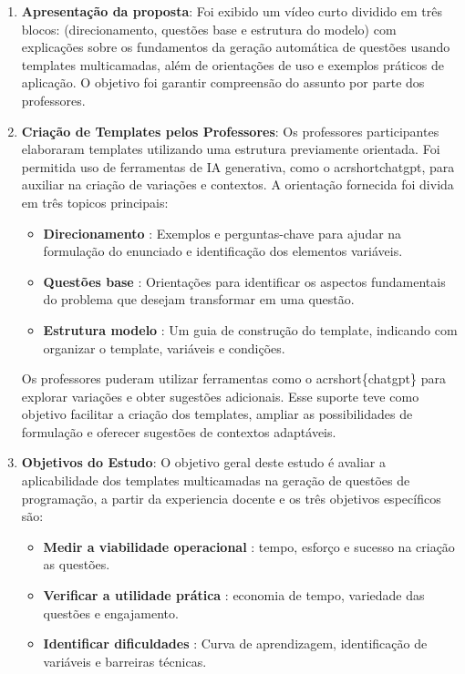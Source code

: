 \begin{enumerate}
    \item \textbf{Apresentação da proposta}:  Foi exibido um vídeo curto dividido em três blocos: (direcionamento, questões base e estrutura do modelo) com explicações sobre os fundamentos da geração automática de questões usando templates multicamadas, além de orientações de uso e exemplos práticos de aplicação. O objetivo foi garantir  compreensão do assunto por parte dos professores.
    
    \item \textbf{Criação de Templates pelos Professores}:  Os professores participantes elaboraram templates utilizando uma estrutura previamente orientada. Foi permitida uso de ferramentas de IA generativa, como o acrshort{chatgpt}, para auxiliar na criação de variações e contextos. A orientação fornecida foi divida em três topicos principais:
    \begin{itemize}
        \item \textbf{Direcionamento} : Exemplos e perguntas-chave para ajudar na formulação do enunciado e identificação dos elementos variáveis.
        \item \textbf{Questões base} : Orientações para identificar os aspectos fundamentais do problema que desejam transformar em uma questão.
        \item \textbf{Estrutura modelo} : Um guia de construção do template, indicando com organizar o template, variáveis e condições.
    \end{itemize}


Os professores puderam utilizar ferramentas como o  acrshort\{chatgpt\} para explorar variações e obter sugestões adicionais. Esse suporte teve como objetivo facilitar a criação dos templates, ampliar as possibilidades de formulação e oferecer sugestões de contextos adaptáveis.



    \item \textbf{Objetivos do Estudo}:  O objetivo geral deste estudo é avaliar a aplicabilidade dos templates multicamadas na geração de questões de programação, a partir da experiencia docente e os três objetivos específicos são:

       \begin{itemize}
        \item \textbf{Medir a viabilidade operacional} : tempo, esforço e sucesso na criação as questões.
        \item \textbf{Verificar a utilidade prática} : economia de tempo, variedade das questões e  engajamento.
        \item \textbf{Identificar dificuldades} : Curva de aprendizagem, identificação de variáveis e barreiras técnicas.
    \end{itemize}
    

\end{enumerate}

